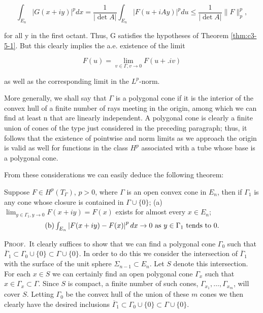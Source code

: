 \[
\int_{E_{n}}|G(x+i y)|^{p}d x=\frac{1}{|\det A|}\int_{E_{n}}|F(u+i A y)|^{p}d u\leq\frac{1}{|\det A|}\|F\|_{p}^{p},
\]

for all y in the first octant. Thus, G satisfies the hypotheses of Theorem \ref{thm:c3-5-1}. But this clearly implies the a.e. existence of the limit

\[
F(u)=\lim_{v\in\Gamma,v\to0}F(u+.iv)
\]

as well as the corresponding limit in the $L^{p}$-norm.

More generally, we shall say that $\Gamma$ is a polygonal cone if it is the interior of the convex hull of a finite number of rays meeting in the origin, among which we can find at least n that are linearly independent. A polygonal cone is clearly a finite union of cones of the type just considered in the preceding paragraph; thus, it follows that the existence of pointwise and norm limits as we approach the origin is valid as well for functions in the class $H^p$ associated with a tube whose base is a polygonal cone.

From these considerations we can easily deduce the following theorem:

\begin{theorem}
\label{thm:c3-5-5}
Suppose $F \in H^p(T_\Gamma)$, $p > 0$, where $\Gamma$ is an open convex cone in $E_n$, then if $\Gamma_1$ is any cone whose closure is contained in $\Gamma \cup \{0\}$;
(a) $\lim_{y \in \Gamma_1, y \to 0} F(x + iy) = F(x)$ exists for almost every $x \in E_n$;
\[
\begin{array}{r l}{\mathrm{(b) }\int_{E_{n}}\left|F(x+i y)-F(x)\right|^{p}d x\to 0\text{ as }y\in\Gamma_{1}\text{ tends to }0.}\end{array}
\]

\end{theorem}

\textsc{Proof.}\ It clearly suffices to show that we can find a polygonal cone $\Gamma_0$ such that $\overline{\Gamma}_1 \subset \Gamma_0 \cup \{0\} \subset \Gamma \cup \{0\}$. In order to do this we consider the intersection of $\overline{\Gamma}_1$ with the surface of the unit sphere $\Sigma_{n-1} \subset E_n$. Let $S$ denote this intersection. For each $x \in S$ we can certainly find an open polygonal cone $\Gamma_x$ such that $x \in \Gamma_x \subset \Gamma$. Since $S$ is compact, a finite number of such cones, $\Gamma_{x_1}, \ldots, \Gamma_{x_m}$, will cover $S$. Letting $\Gamma_0$ be the convex hull of the union of these $m$ cones we then clearly have the desired inclusions $\overline{\Gamma}_1 \subset \Gamma_0 \cup \{0\} \subset \Gamma \cup \{0\}$.

